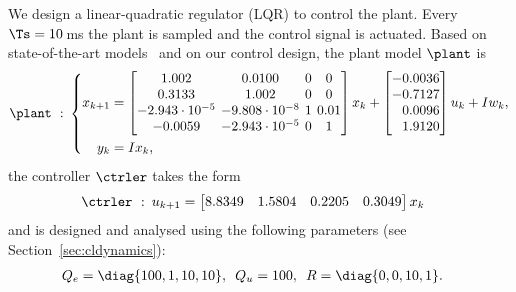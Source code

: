 We design a linear-quadratic regulator (LQR) to control the plant. 
Every $\Ts=10\,$ms the plant is sampled and the control signal is actuated.
Based on state-of-the-art models~\cite{Cazzolato:2011} and on our control design, the plant model $\plant$ is
\begin{equation}
    \label{eq:furuta}
    \setlength\arraycolsep{2pt}
    \begin{aligned}
        \plant \,\, : \,\, & \left\{ 
        \begin{aligned}
            x_{k+1} &= 
            \begin{bmatrix*}[c] 
                1.002 & 0.0100 & 0 & 0 \\
                0.3133 & 1.002 & 0 & 0 \\
                -2.943\cdot 10^{-5} & -9.808\cdot 10^{-8} & 1 & 0.01 \\
                -0.0059 & -2.943\cdot 10^{-5} & 0 & 1
            \end{bmatrix*} x_k + 
            \begin{bmatrix*}[c]
                -0.0036 \\
                -0.7127 \\
                \textcolor{white}{+}0.0096 \\
                \textcolor{white}{+}1.9120
            \end{bmatrix*} u_k + I w_k,\\
            y_k &= I x_k, 
        \end{aligned} \right. \\
    \end{aligned}
\end{equation}
the controller $\ctrler$ takes the form
\begin{equation}
    \label{eq:furuta2}
    \begin{aligned}
        \ctrler \,\, : \,\,\, & u_{k+1} = 
        \begin{bmatrix*}[c]
        8.8349 & 1.5804 & 0.2205 & 0.3049
        \end{bmatrix*} x_k 
    \end{aligned}
\end{equation}
and is designed and analysed using the following parameters (see Section~\ref{sec:cldynamics}):
\begin{equation}
    \label{eq:furuta3}
    \begin{aligned}
        Q_e &= \diag{100,1,10,10}, \,\,\, Q_u = 100, \,\,\, R = \diag{0, 0, 10, 1}.
    \end{aligned}
\end{equation}

